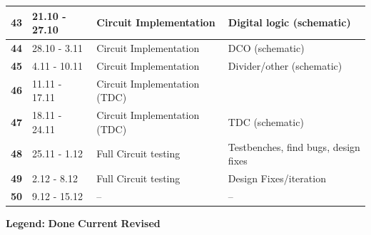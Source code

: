 \documentclass[t, screen, aspectratio=43]{beamer}
\begin{document}
\begin{frame}
\begin{table}[htb!]
\begin{tabular}{|l|l|l|l|}
			\hline 
			\rule[-1ex]{0pt}{2.5ex} \textbf{43}& 21.10 - 27.10& Circuit Implementation& Digital logic (schematic)\\ 
			\hline 
			\rule[-1ex]{0pt}{2.5ex} \textbf{44}& 28.10 - 3.11& Circuit Implementation& DCO (schematic)\\ 
			\hline 
			\rule[-1ex]{0pt}{2.5ex} \textbf{45}& 4.11 - 10.11& Circuit Implementation& Divider/other (schematic)\\ 
			\hline 
			\rule[-1ex]{0pt}{2.5ex} \textbf{46}& 11.11 - 17.11& Circuit Implementation (TDC)& \\ 
			\hline 
			\rule[-1ex]{0pt}{2.5ex} \textbf{47}& 18.11 - 24.11& Circuit Implementation (TDC)& TDC (schematic)\\ 
			\hline 
			\rule[-1ex]{0pt}{2.5ex} \textbf{48}& 25.11 - 1.12& Full Circuit testing & Testbenches, find bugs, design fixes\\ 
			\hline 
			\rule[-1ex]{0pt}{2.5ex} \textbf{49}& 2.12 - 8.12& Full Circuit testing& Design Fixes/iteration\\ 
			\hline 
			\rule[-1ex]{0pt}{2.5ex} \textbf{50}& 9.12 - 15.12& --& --\\ 
			\hline 
		\end{tabular}
		\begin{flushleft}\textbf{Legend:} \colorbox{red!20}{\textbf{Done}} \colorbox{green!20}{\textbf{Current}}  \colorbox{blue!20}{\textbf{Revised}}
		\end{flushleft}
	\end{table}   
\end{frame}


\end{document}
